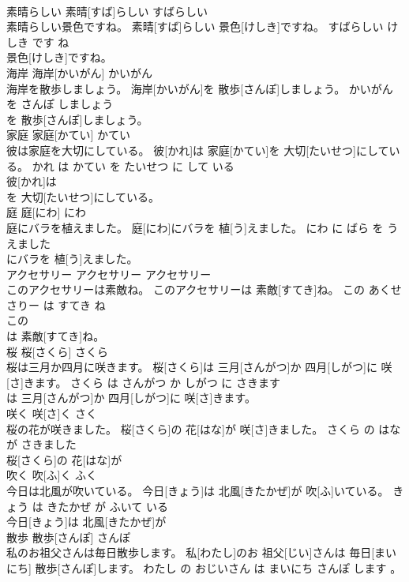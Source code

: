 \documentclass[8pt]{extreport}
\begin{document}
\begin{CJK}{UTF8}{min}
\\	素晴らしい	素晴[すば]らしい	すばらしい	
\\	素晴らしい景色ですね。	素晴[すば]らしい 景色[けしき]ですね。	すばらしい けしき です ね	
\\	景色[けしき]ですね。			
\\	海岸	海岸[かいがん]	かいがん	
\\	海岸を散歩しましょう。	海岸[かいがん]を 散歩[さんぽ]しましょう。	かいがん を さんぽ しましょう	
\\	を 散歩[さんぽ]しましょう。			
\\	家庭	家庭[かてい]	かてい	
\\	彼は家庭を大切にしている。	彼[かれ]は 家庭[かてい]を 大切[たいせつ]にしている。	かれ は かてい を たいせつ に して いる	
\\	彼[かれ]は
\\	を 大切[たいせつ]にしている。			
\\	庭	庭[にわ]	にわ	
\\	庭にバラを植えました。	庭[にわ]にバラを 植[う]えました。	にわ に ばら を うえました	
\\	にバラを 植[う]えました。			
\\	アクセサリー	アクセサリー	アクセサリー	
\\	このアクセサリーは素敵ね。	このアクセサリーは 素敵[すてき]ね。	この あくせさりー は すてき ね	
\\	この
\\	は 素敵[すてき]ね。			
\\	桜	桜[さくら]	さくら	
\\	桜は三月か四月に咲きます。	桜[さくら]は 三月[さんがつ]か 四月[しがつ]に 咲[さ]きます。	さくら は さんがつ か しがつ に さきます	
\\	は 三月[さんがつ]か 四月[しがつ]に 咲[さ]きます。			
\\	咲く	咲[さ]く	さく	
\\	桜の花が咲きました。	桜[さくら]の 花[はな]が 咲[さ]きました。	さくら の はな が さきました	
\\	桜[さくら]の 花[はな]が
\\	吹く	吹[ふ]く	ふく	
\\	今日は北風が吹いている。	今日[きょう]は 北風[きたかぜ]が 吹[ふ]いている。	きょう は きたかぜ が ふいて いる	
\\	今日[きょう]は 北風[きたかぜ]が
\\	散歩	散歩[さんぽ]	さんぽ	
\\	私のお祖父さんは毎日散歩します。	私[わたし]のお 祖父[じい]さんは 毎日[まいにち] 散歩[さんぽ]します。	わたし の おじいさん は まいにち さんぽ します 。	

\end{CJK}
\end{document}
